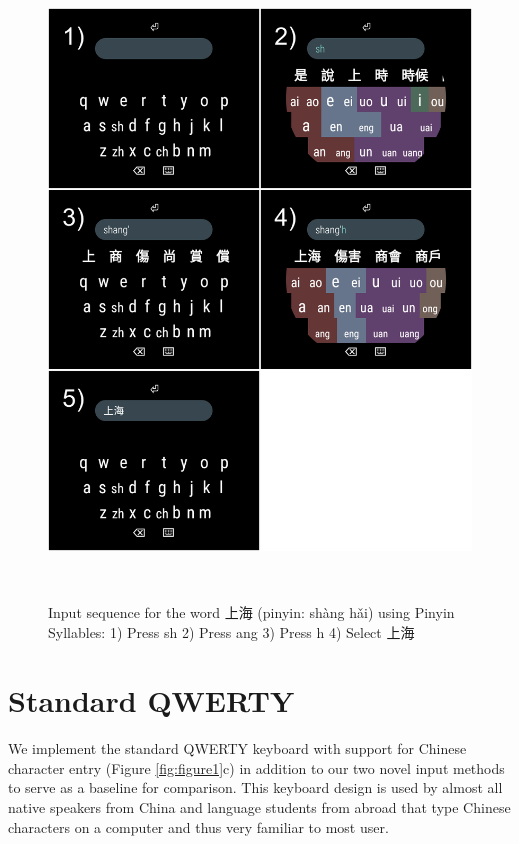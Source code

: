 \begin{figure}
  \centering
  \includegraphics[width=1\columnwidth]{figures/sequence_PinyinSyllables}
  \caption{Input sequence for the word 上海 (pinyin: shàng hǎi) using Pinyin Syllables: 1) Press sh 2) Press ang 3) Press h 4) Select 上海}~\label{fig:figure3}
\end{figure}







\section{Standard QWERTY}
We implement the standard QWERTY keyboard with support for Chinese character entry (Figure \ref{fig:figure1}c) in addition to our two novel input methods to serve as a baseline for comparison. This keyboard design is used by almost all native speakers from China and language students from abroad that type Chinese characters on a computer and thus very familiar to most user.




